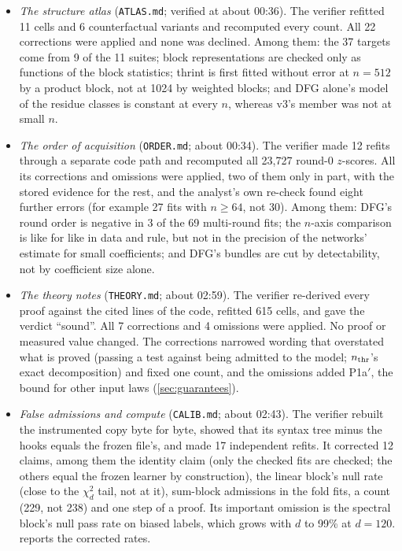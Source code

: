 \begin{itemize}
\item \emph{The structure atlas} (\texttt{ATLAS.md}; verified at about 00:36). The verifier refitted 11 cells and 6 counterfactual variants and recomputed every count. All 22 corrections were applied and none was declined. Among them: the 37 targets come from 9 of the 11 suites; block representations are checked only as functions of the block statistics; thrint is first fitted without error at $n=512$ by a product block, not at 1024 by weighted blocks; and DFG alone's model of the residue classes is constant at every $n$, whereas v3's member was not at small $n$.
\item \emph{The order of acquisition} (\texttt{ORDER.md}; about 00:34). The verifier made 12 refits through a separate code path and recomputed all 23,727 round-0 $z$-scores. All its corrections and omissions were applied, two of them only in part, with the stored evidence for the rest, and the analyst's own re-check found eight further errors (for example 27 fits with $n\ge64$, not 30). Among them: DFG's round order is negative in 3 of the 69 multi-round fits; the $n$-axis comparison is like for like in data and rule, but not in the precision of the networks' estimate for small coefficients; and DFG's bundles are cut by detectability, not by coefficient size alone.
\item \emph{The theory notes} (\texttt{THEORY.md}; about 02:59). The verifier re-derived every proof against the cited lines of the code, refitted 615 cells, and gave the verdict ``sound''. All 7 corrections and 4 omissions were applied. No proof or measured value changed. The corrections narrowed wording that overstated what is proved (passing a test against being admitted to the model; $n_{\rm thr}$'s exact decomposition) and fixed one count, and the omissions added P1a$'$, the bound for other input laws (\cref{sec:guarantees}).
\item \emph{False admissions and compute} (\texttt{CALIB.md}; about 02:43). The verifier rebuilt the instrumented copy byte for byte, showed that its syntax tree minus the hooks equals the frozen file's, and made 17 independent refits. It corrected 12 claims, among them the identity claim (only the checked fits are checked; the others equal the frozen learner by construction), the linear block's null rate (close to the $\chi^2_d$ tail, not at it), sum-block admissions in the fold fits, a count (229, not 238) and one step of a proof. Its important omission is the spectral block's null pass rate on biased labels, which grows with $d$ to 99\% at $d=120$.  reports the corrected rates.

\end{itemize}
